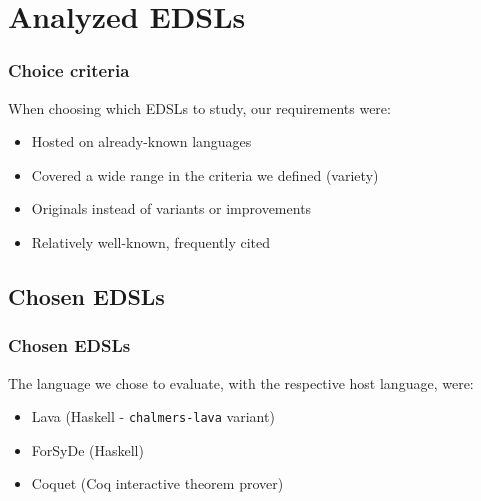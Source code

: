 \section{Analyzed EDSLs}
\label{sec:analyzed-edsls}
    \frame{\sectionpage}

    \begin{frame}
        \frametitle{Choice criteria}

        \par{When choosing which EDSLs to study, our requirements were:}
        \vspace{0.3cm}
        \begin{itemize}
            \item Hosted on already-known languages
            \item Covered a wide range in the criteria we defined (variety)
            \item Originals instead of variants or improvements
            \item Relatively well-known, frequently cited
        \end{itemize}
    \end{frame}


    \subsection{Chosen EDSLs}
    \label{subsec:chosen-edsls}
        \begin{frame}
            \frametitle{Chosen EDSLs}
            \par{The language we chose to evaluate, with the respective host language, were:}
            \vspace{0.3cm}
            \begin{itemize}
                \item Lava (Haskell - \texttt{chalmers-lava} variant)
                \item ForSyDe (Haskell)
                \item Coquet (Coq interactive theorem prover)
            \end{itemize}
        \end{frame}

